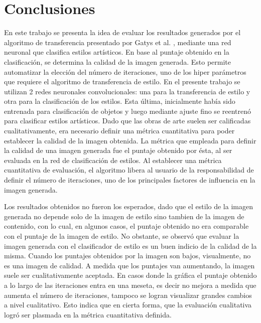 \documentclass[a4paper,11pt,spanish]{book}
\begin{document}
  \section{Conclusiones}
    En este trabajo se presenta la idea de evaluar los resultados generados por el algoritmo de transferencia presentado por Gatys et al. \cite{Gatys:Neural_Style}, 
    mediante una red neuronal que clasifica estilos artísticos. En base al puntaje obtenido en la clasificación, se determina la calidad de la imagen generada. 
    Esto permite automatizar la elección del número de iteraciones, uno de los hiper parámetros que requiere el algoritmo de transferencia de estilo.
    En el presente trabajo se utilizan 2 redes neuronales convolucionales: una para la transferencia de estilo y otra para la clasificación de los estilos.
    Esta última, inicialmente había sido entrenada para clasificación de objetos y luego mediante ajuste fino se reentrenó para clasificar estilos artísticos.
    Dado que las obras de arte suelen ser calificadas cualitativamente, era necesario definir una métrica cuantitativa para poder establecer la calidad de la imagen obtenida.
    La métrica que empleada para definir la calidad de una imagen generada fue el puntaje obtenido por ésta, al ser evaluada en la red de clasificación de estilos. 
    Al establecer una métrica cuantitativa de evaluación, el algoritmo libera al usuario de la responsabilidad de definir el número de iteraciones, uno de los principales factores 
    de influencia en la imagen generada.
    
    Los resultados obtenidos no fueron los esperados, dado que el estilo de la imagen generada no depende solo de la imagen de estilo sino tambien de la imagen de contenido,
    con lo cual, en algunos casos, el puntaje obtenido no era comparable con el puntaje de la imagen de estilo. 
    No obstante, se observó que evaluar la imagen generada con el clasificador de estilo es un buen indicio de la calidad de la misma. 
    Cuando los puntajes obtenidos por la imagen son bajos, visualmente, no es una imagen de calidad. 
    A medida que los puntajes van aumentando, la imagen suele ser cualitativamente aceptada. 
    En casos donde la gráfica el puntaje obtenido a lo largo de las iteraciones entra en una meseta, es decir no mejora a medida que aumenta el número de iteraciones,
    tampoco se logran visualizar grandes cambios a nivel cualitativo. 
    Esto indica que en cierta forma, que la evaluación cualitativa logró ser plasmada en la métrica cuantitativa definida.
  
\end{document}
